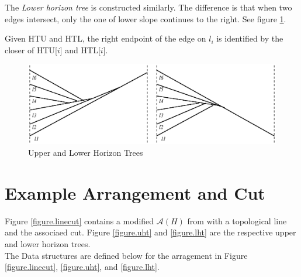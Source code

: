 \documentclass[12pt]{article}
\begin{document}
        The {\em Lower horizon tree} is constructed similarly.  The difference is
        that when two edges intersect, only the one of lower slope continues
        to the right. See figure \ref{figure.upperlower}.

        Given HTU and HTL, the right endpoint of the edge on $l_{i}$ is
        identified by the closer of HTU[$i$] and HTL[$i$].

        \begin{figure}
            \center
            \includegraphics[viewport=239 310 369 388]{upperlower_HT.eps}
            \caption{Upper and Lower Horizon Trees}
            \label{figure.upperlower}
        \end{figure}
    \newpage


        \section{Example Arrangement and Cut} %
        \label{sec:example}

        Figure \ref{figure.linecut} contains a modified $\mathscr{A}(H)$ from \cite{edel1989} with a topological line and the associaed cut. Figure \ref{figure.uht} and \ref{figure.lht} are the respective upper and lower horizon trees. \\ 

        The Data structures are defined below for the arragement in Figure \ref{figure.linecut}, \ref{figure.uht}, and \ref{figure.lht}. \\
\end{document}
